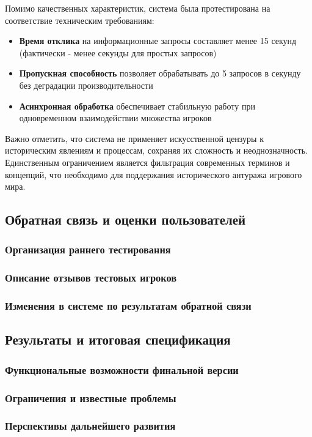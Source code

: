 Помимо качественных характеристик, система была протестирована на соответствие техническим требованиям:

\begin{itemize}
\item \textbf{Время отклика} на информационные запросы составляет менее 15 секунд (фактически - менее секунды для простых запросов)
\item \textbf{Пропускная способность} позволяет обрабатывать до 5 запросов в секунду без деградации производительности
\item \textbf{Асинхронная обработка} обеспечивает стабильную работу при одновременном взаимодействии множества игроков
\end{itemize}

Важно отметить, что система не применяет искусственной цензуры к историческим явлениям и процессам, сохраняя их сложность и неоднозначность. Единственным ограничением является фильтрация современных терминов и концепций, что необходимо для поддержания исторического антуража игрового мира.

\subsection{Обратная связь и оценки пользователей}
\subsubsection{Организация раннего тестирования}
\subsubsection{Описание отзывов тестовых игроков}
\subsubsection{Изменения в системе по результатам обратной связи}

\subsection{Результаты и итоговая спецификация}
\subsubsection{Функциональные возможности финальной версии}
\subsubsection{Ограничения и известные проблемы}
\subsubsection{Перспективы дальнейшего развития}